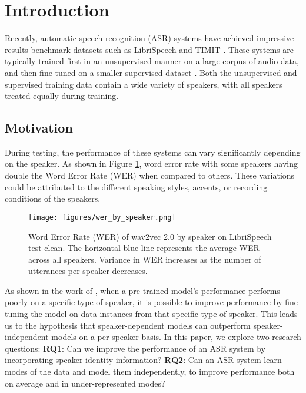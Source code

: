 \section{Introduction}

Recently, automatic speech recognition (ASR) systems have achieved impressive results benchmark datasets such as LibriSpeech \cite{librispeech} and TIMIT \cite{timit}.
These systems are typically trained first in an unsupervised manner on a large corpus of audio data, and then fine-tuned on a smaller supervised dataset \cite{wav2vec2, TODO}.
Both the unsupervised and supervised training data contain a wide variety of speakers, with all speakers treated equally during training.
\subsection{Motivation}

During testing, the performance of these systems can vary significantly depending on the speaker.
As shown in Figure \ref{fig:by_speaker}, word error rate with some speakers having double the Word Error Rate (WER) when compared to others.
These variations could be attributed to the different speaking styles, accents, or recording conditions of the speakers.

\begin{figure}[h]
      \centering
      \texttt{[image: figures/wer\_by\_speaker.png]}
      \caption{
          Word Error Rate (WER) of wav2vec 2.0 by speaker on LibriSpeech test-clean.
          The horizontal blue line represents the average WER across all speakers.
          Variance in WER increases as the number of utterances per speaker decreases.
  }
      \label{fig:by_speaker}
\end{figure}

As shown in the work of \cite{childspeech}, when a pre-trained model's performance performs poorly on a specific type of speaker, 
it is possible to improve performance by fine-tuning the model on data instances from that specific type of speaker.
This leads us to the hypothesis that speaker-dependent models can outperform speaker-independent models on a per-speaker basis.
In this paper, we explore two research questions:
\textbf{RQ1}: Can we improve the performance of an ASR system by incorporating speaker identity information?
\textbf{RQ2}: Can an ASR system learn modes of the data and model them independently, to improve performance both on average and in under-represented modes?

